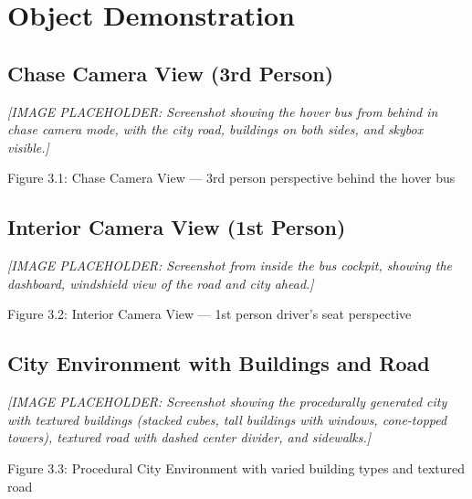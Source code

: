 \documentclass[12pt,a4paper]{article}
\begin{document}
\section{Object Demonstration}

\subsection{Chase Camera View (3rd Person)}

\textit{[IMAGE PLACEHOLDER: Screenshot showing the hover bus from behind in chase camera mode, with the city road, buildings on both sides, and skybox visible.]}

\begin{center}
    Figure 3.1: Chase Camera View --- 3rd person perspective behind the hover bus
\end{center}

\subsection{Interior Camera View (1st Person)}

\textit{[IMAGE PLACEHOLDER: Screenshot from inside the bus cockpit, showing the dashboard, windshield view of the road and city ahead.]}

\begin{center}
    Figure 3.2: Interior Camera View --- 1st person driver's seat perspective
\end{center}

\subsection{City Environment with Buildings and Road}

\textit{[IMAGE PLACEHOLDER: Screenshot showing the procedurally generated city with textured buildings (stacked cubes, tall buildings with windows, cone-topped towers), textured road with dashed center divider, and sidewalks.]}

\begin{center}
    Figure 3.3: Procedural City Environment with varied building types and textured road
\end{center}
\end{document}
